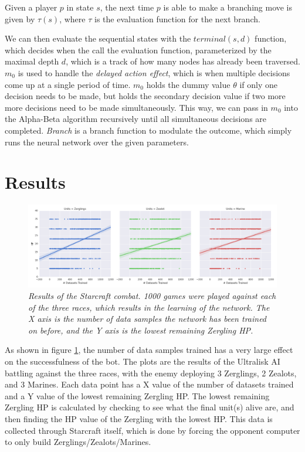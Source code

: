 \documentclass[twocolumn]{article}
\begin{document}
Given a player $p$ in state $s$, the next time $p$ is able to make a branching move is given by $\tau(s)$, where $\tau$ is the evaluation function for the next branch. 

We can then evaluate the sequential states with the $terminal(s, d)$ function, which decides when the call the evaluation function, parameterized by the maximal depth $d$, which is a track of how many nodes has already been traversed. $m_0$ is used to handle the \textit{delayed action effect}, which is when multiple decisions come up at a single period of time. $m_0$ holds the dummy value $\theta$ if only one decision needs to be made, but holds the secondary decision value if two more more decisions need to be made simultaneously. This way, we can pass in $m_0$ into the Alpha-Beta algorithm recursively until all simultaneous decisions are completed. \textit{Branch} is a branch function to modulate the outcome, which simply runs the neural network over the given parameters. 

\section{Results}
\begin{figure}
	\begin{center}
		\includegraphics[width = \textwidth]{../plots/zerglingHP.png}
	\end{center}
	\caption{\textit{Results of the Starcraft combat. 1000 games were played against each of the three races, which results in the learning of the network. The X axis is the number of data samples the network has been trained on before, and the Y axis is the lowest remaining Zergling HP.}}
	\label{fig:results}
\end{figure}
As shown in figure \ref{fig:results}, the number of data samples trained has a very large effect on the successfulness of the bot. The plots are the results of the Ultralisk AI battling against the three races, with the enemy deploying 3 Zerglings, 2 Zealots, and 3 Marines. Each data point has a X value of the number of datasets trained and a Y value of the lowest remaining Zergling HP. The lowest remaining Zergling HP is calculated by checking to see what the final unit(s) alive are, and then finding the HP value of the Zergling with the lowest HP. This data is collected through Starcraft itself, which is done by forcing the opponent computer to only build Zerglings/Zealots/Marines. 
\end{document}
